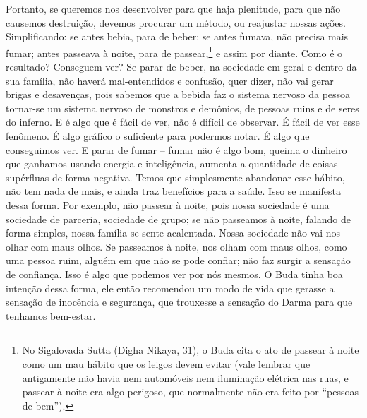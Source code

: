 Portanto, se queremos nos desenvolver
para que haja plenitude, para que não causemos destruição, devemos
procurar um método, ou reajustar nossas ações. Simplificando: se antes
bebia, para de beber; se antes fumava, não precisa mais fumar; antes
passeava à noite, para de passear,\footnote{No Sigalovada Sutta (Digha
Nikaya, 31), o Buda cita o ato de passear à noite como um mau hábito
que os leigos devem evitar (vale lembrar que antigamente não havia nem
automóveis nem iluminação elétrica nas ruas, e passear à noite era algo
perigoso, que normalmente não era feito por “pessoas de bem”).} e
assim por diante. Como é o resultado? Conseguem ver? Se parar de beber,
na sociedade em geral e dentro da sua família, não haverá
mal-entendidos e confusão, quer dizer, não vai gerar brigas e
desavenças, pois sabemos que a bebida faz o sistema nervoso da pessoa
tornar-se um sistema nervoso de monstros e demônios, de pessoas ruins e
de seres do inferno. E é algo que é fácil de ver, não é difícil de
observar. É fácil de ver esse fenômeno. É algo
gráfico o suficiente para podermos notar. É
algo que conseguimos ver. E parar de fumar – fumar não é algo bom,
queima o dinheiro que ganhamos usando energia e inteligência, aumenta a
quantidade de coisas supérfluas de forma negativa. Temos que
simplesmente abandonar esse hábito, não tem nada de
mais, e ainda traz benefícios para a saúde.
Isso se manifesta dessa forma. Por exemplo, não passear à noite, pois
nossa sociedade é uma sociedade de parceria, sociedade de grupo; se não
passeamos à noite, falando de forma simples, nossa família se sente
acalentada. Nossa sociedade não vai nos olhar com maus olhos. Se
passeamos à noite, nos olham com maus olhos, como uma pessoa ruim,
alguém em que não se pode confiar; não faz surgir a sensação de
confiança. Isso é algo que podemos ver por
nós mesmos. O Buda tinha boa intenção dessa
forma, ele então recomendou um modo de vida que gerasse a sensação de
inocência e segurança, que trouxesse a sensação do Darma para que
tenhamos bem-estar. 

